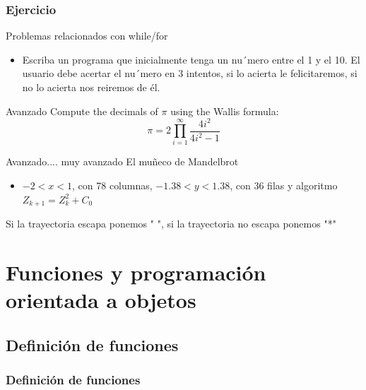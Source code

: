 \documentclass[10pt,colorlinks]{beamer}
\begin{document}
\begin{frame}[fragile]\frametitle{Ejercicio}

\begin{block}{Problemas relacionados con while/for}
\begin{itemize}
\item Escriba un programa que inicialmente tenga un nu´mero entre el 1 y el 10. El usuario debe acertar el nu´mero en 3 intentos, si lo acierta le felicitaremos, si no lo acierta nos reiremos de él.

\end{itemize}
\end{block}
\begin{block}{Avanzado}
Compute the decimals of $\pi$ using the Wallis formula:\tiny
\[
\pi=2\prod_{i=1}^{\infty}\frac{4i^2}{4i^2-1}
\]\normalsize
\end{block}


\begin{block}{Avanzado.... muy avanzado}
El muñeco de Mandelbrot
\begin{itemize}
\item    $-2<x<1$, con 78 columnas, $-1.38<y<1.38$, con 36 filas y algoritmo $Z_{k+1}=Z_{k}^2+C_0$
\end{itemize}
Si la trayectoria escapa ponemos " ", si la trayectoria no escapa ponemos "*"
\end{block}

\end{frame}




\section{Funciones y programación orientada a objetos}
\subsection{Definición de funciones}
\begin{frame}[fragile]\frametitle{Definición de funciones}

\end{frame}
\end{document}

